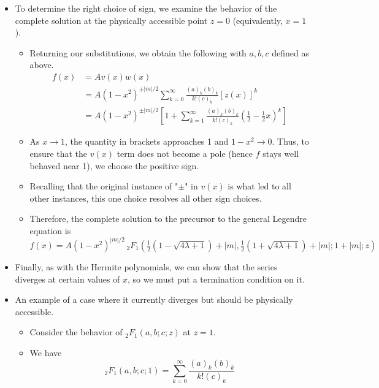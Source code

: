 \documentclass[../finalProject.tex]{subfiles}
\begin{document}
\begin{itemize}
\begin{itemize}
\begin{equation*}
        \end{equation*}
    \end{itemize}
    \item To determine the right choice of sign, we examine the behavior of the complete solution at the physically accessible point $z=0$ (equivalently, $x=1$).
    \begin{itemize}
        \item Returning our substitutions, we obtain the following with $a,b,c$ defined as above.
        \begin{align*}
            f(x) &= Av(x)w(x)\\
            &= A(1-x^2)^{\pm|m|/2}\sum_{k=0}^\infty\frac{(a)_k(b)_k}{k!(c)_k}[z(x)]^k\\
            &= A(1-x^2)^{\pm|m|/2}\left[ 1+\sum_{k=1}^\infty\frac{(a)_k(b)_k}{k!(c)_k}(\tfrac{1}{2}-\tfrac{1}{2}x)^k \right]
        \end{align*}
        \item As $x\to 1$, the quantity in brackets approaches 1 and $1-x^2\to 0$. Thus, to ensure that the $v(x)$ term does not become a pole (hence $f$ stays well behaved near 1), we choose the positive sign.
        \item Recalling that the original instance of "$\pm$" in $v(x)$ is what led to all other instances, this one choice resolves all other sign choices.
        \item Therefore, the complete solution to the precursor to the general Legendre equation is
        \begin{equation*}
            f(x) = A(1-x^2)^{|m|/2}\,{}_2F_1(\tfrac{1}{2}(1-\sqrt{4\lambda+1})+|m|,\tfrac{1}{2}(1+\sqrt{4\lambda+1})+|m|;1+|m|;z)
        \end{equation*}
    \end{itemize}
    \item Finally, as with the Hermite polynomials, we can show that the series diverges at certain values of $x$, so we must put a termination condition on it.
    \item An example of a case where it currently diverges but should be physically accessible.
    \begin{itemize}
        \item Consider the behavior of ${}_2F_1(a,b;c;z)$ at $z=1$.
        \item We have
        \begin{equation*}
            {}_2F_1(a,b;c;1) = \sum_{k=0}^\infty\frac{(a)_k(b)_k}{k!(c)_k}
        \end{equation*}

\end{itemize}
\end{itemize}
\end{document}
